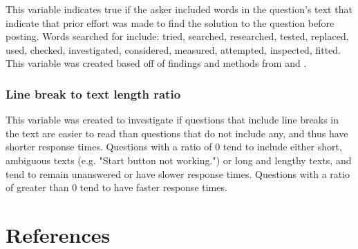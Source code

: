 \documentclass[preprint]{elsarticle}\usepackage[]{graphicx}\usepackage[]{color}
\begin{document}
This variable indicates true if the asker included words in the question's text that indicate that prior effort was made to find the solution to the question before posting. Words searched for include: tried, searched, researched, tested, replaced, used, checked, investigated, considered, measured, attempted, inspected, fitted. This variable was created based off of findings and methods from \citep{Bhat2014} and \citep{Harper2008}. 


\subsubsection{Line break to text length ratio}

This variable was created to investigate if questions that include line breaks in the text are easier to read than questions that do not include any, and thus have shorter response times. Questions with a ratio of 0 tend to include either short, ambiguous texts (e.g. "Start button not working.") or long and lengthy texts, and tend to remain unanswered or have slower response times. Questions with a ratio of greater than 0 tend to have faster response times. 



\section*{References}



\end{document}
